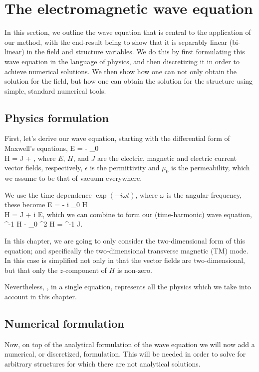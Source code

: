 \section{The electromagnetic wave equation}
In this section, we outline the wave equation
    that is central to the application of our method,
    with the end-result being to show that it is 
    separably linear (bi-linear) in the field and structure variables.
We do this by first formulating this wave equation in the language of physics,
    and then discretizing it in order to achieve numerical solutions.
We then show how one can not only obtain the solution for the field,
    but how one can obtain the solution for the structure using
    simple, standard numerical tools.

\subsection{Physics formulation}
First, let's derive our wave equation,
    starting with the differential form of Maxwell's equations, 
\BA \curl E = - \mu_0  \\
    \curl H = J + \epsilon {}, \EA
    where $E$, $H$, and $J$ are 
    the electric, magnetic and electric current %
    vector fields, respectively,
    $\epsilon$ is the permittivity
    and $\mu_0$ is the permeability, which we assume to be 
    that of vacuum everywhere.


We use the time dependence $\exp(-i \omega t)$, 
    where $\omega$ is the angular frequency,
    these become
\BA \curl E = - i \mu_0 \omega H \\
    \curl H = J + i \epsilon \omega E, \label{eq:H2E} \EA
    which we can combine to form our (time-harmonic) wave equation,
\BE \curl \epsilon^{-1} \curl H - \mu_0 \omega^2 H = \curl \epsilon^{-1} J. 
    \label{eq:wave} \EE

In this chapter, we are going to only consider the two-dimensional form
    of this equation; and specifically 
    the two-dimensional transverse magnetic (TM) mode. %
In this case  is simplified not only in that
    the vector fields are two-dimensional, 
    but that only the $z$-component of $H$ is non-zero.

Nevertheless, , in a single equation,
    represents all the physics which we take into account in this chapter.

\subsection{Numerical formulation}
Now, on top of the analytical formulation of the wave equation 
    we will now add a numerical, or discretized, formulation.
This will be needed in order to solve for arbitrary structures
    for which there are not analytical solutions.

